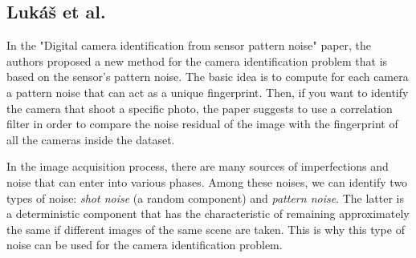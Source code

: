 \subsection{Lukáš et al.}
In the "Digital camera identification from sensor pattern noise" paper, the authors proposed a new method for the camera identification problem that is based on the sensor's pattern noise. 
The basic idea is to compute for each camera a pattern noise that can act as a unique fingerprint. Then, if you want to identify the camera that shoot a specific photo, the paper suggests to use a correlation filter in order to compare the noise residual of the image with the fingerprint of all the cameras inside the dataset.

In the image acquisition process, there are many sources of imperfections and noise that can enter into various phases. Among these noises, we can identify two types of noise: \textit{shot noise} (a random component) and \textit{pattern noise}. The latter is a deterministic component that has the characteristic of remaining approximately the same if different images of the same scene are taken. This is why this type of noise can be used for the camera identification problem.